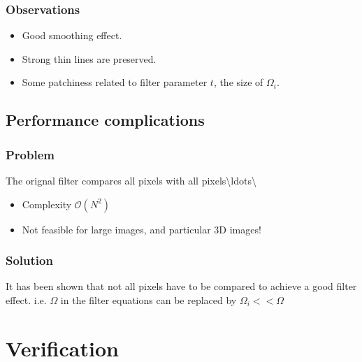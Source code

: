 \documentclass[letterpaper,10pt,english]{sphinxmanual}
\begin{document}
\subsection{Observations}
\label{\detokenize{02-ImageEnhancement:observations}}\begin{itemize}
\item {} 
\sphinxAtStartPar
Good smoothing effect.

\item {} 
\sphinxAtStartPar
Strong thin lines are preserved.

\item {} 
\sphinxAtStartPar
Some patchiness related to filter parameter \(t\),  the size of \(\Omega_i\).

\end{itemize}


\section{Performance complications}
\label{\detokenize{02-ImageEnhancement:performance-complications}}

\subsection{Problem}
\label{\detokenize{02-ImageEnhancement:id3}}
\sphinxAtStartPar
The orignal filter compares all pixels with all pixels\textbackslash{}ldots\textbackslash{}
\begin{itemize}
\item {} 
\sphinxAtStartPar
Complexity \(\mathcal{O}(N^2)\)

\item {} 
\sphinxAtStartPar
Not feasible for large images, and particular 3D images!

\end{itemize}


\subsection{Solution}
\label{\detokenize{02-ImageEnhancement:solution}}
\sphinxAtStartPar
It has been shown that not all pixels have to be compared to achieve a good filter effect.
i.e. \(\Omega\) in the filter equations can be replaced by \(\Omega_i<<\Omega\)


\chapter{Verification}
\label{\detokenize{02-ImageEnhancement:verification}}
\end{document}
